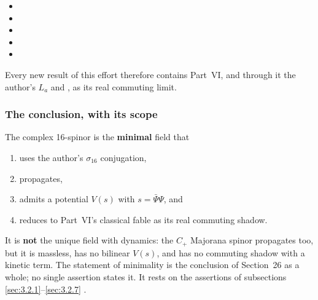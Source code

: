 \begin{itemize}
  \item {}
  \item {}
  \item {}
  \item {}
  \item {}
\end{itemize}
Every new result of this effort therefore contains Part~VI, and through it the author's $L_a$ and
, as its real commuting limit.

\subsubsection{The conclusion, with its scope}
\label{sec:3.2.8}

The complex 16-spinor is the \textbf{minimal} field that
\begin{enumerate}
  \item uses the author's $\sigma_{16}$ conjugation,
  \item propagates,
  \item admits a potential $V(s)$ with $s=\bar\Psi\Psi$, and
  \item reduces to Part~VI's classical fable as its real commuting shadow.
\end{enumerate}
It is \textbf{not} the unique field with dynamics: the $C_+$ Majorana spinor propagates too, but it
is massless, has no bilinear $V(s)$, and has no commuting shadow with a kinetic term. The statement
of minimality is the conclusion of Section~26 as a whole; no single assertion states it. It rests
on the assertions of subsections \ref{sec:3.2.1}--\ref{sec:3.2.7} .

